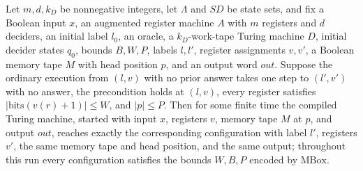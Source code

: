 \begin{theorem}
\label{Complexity.LogProg.mdet_live}
\leanok
{}
Let $m,d,k_D$ be nonnegative integers, let $\Lambda$ and $SD$ be state sets, and fix a
Boolean input $x$, an augmented register machine $A$ with $m$ registers and $d$
deciders, an initial label $l_0$, an oracle, a $k_D$-work-tape Turing machine $D$,
initial decider states $q_0$, bounds $B,W,P$, labels $l,l'$, register assignments
$v,v'$, a Boolean memory tape $M$ with head position $p$, and an output word $out$.
Suppose the ordinary execution from $(l,v)$ with no prior answer takes one step to
$(l',v')$ with no answer, the precondition holds at $(l,v)$, every register satisfies
$|\mathrm{bits}(v(r)+1)|\le W$, and $|p|\le P$. Then for some finite time the compiled
Turing machine, started with input $x$, registers $v$, memory tape $M$ at $p$, and
output $out$, reaches exactly the corresponding configuration with label $l'$, registers
$v'$, the same memory tape and head position, and the same output; throughout this run
every configuration satisfies the bounds $W,B,P$ encoded by $\mathrm{MBox}$.
\end{theorem}

